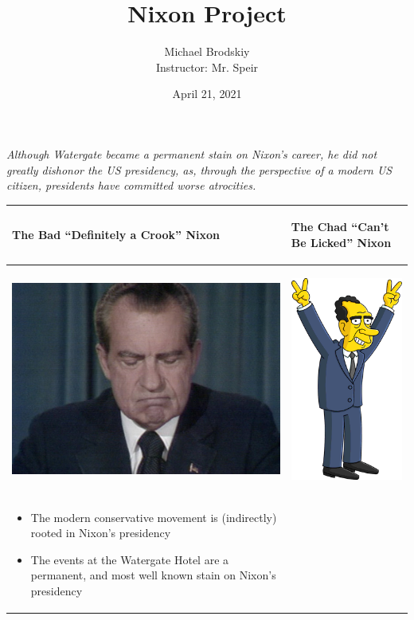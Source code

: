 \documentclass[12pt,landscape]{article}
\title{Nixon Project}
\date{April 21, 2021}
\author{Michael Brodskiy\\ \small Instructor: Mr. Speir}
\begin{document}
\maketitle

\begin{justify}
  \textit{Although Watergate became a permanent stain on Nixon's career, he did not greatly dishonor the US presidency, as, through the perspective of a modern US citizen, presidents have committed worse atrocities.}
\end{justify}

\begin{center}
  \begin{tabular}[h!]{| p{} | p{} |}
    \hline
    \begin{center} The Bad “\textbf{Definitely a Crook}” Nixon \end{center} & \begin{center} The Chad “\textbf{Can't Be Licked}” Nixon \end{center} \\
    \hline
    \begin{center} \includegraphics[width=.375\textwidth]{Images/NixonBad.jpeg}  \end{center} & \begin{center} \includegraphics[width=.175\textwidth]{Images/NixonGood.png}  \end{center}\\
    \hline
    \begin{itemize}
      \item The modern conservative movement is (indirectly) rooted in Nixon's presidency
      \item The events at the Watergate Hotel are a permanent, and most well known stain on Nixon's presidency

\end{itemize}
\end{tabular}
\end{center}
\end{document}
